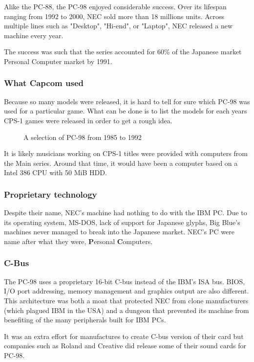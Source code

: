 Alike the PC-88, the PC-98 enjoyed considerable success. Over its lifespan ranging from 1992 to 2000, NEC sold more than 18 millions units. Across multiple lines such as "Desktop", "Hi-end", or "Laptop", NEC released a new machine every year\cite{9800lines}. 

The success was such that the series accounted for 60\% of the Japanese market Personal Computer market by 1991. 



\subsubsection{What Capcom used}
Because so many models were released, it is hard to tell for sure which PC-98 was used for a particular game. What can be done is to list the models for each years CPS-1 games were released in order to get a rough idea.

\begin{figure}[H]
\caption*{A selection of PC-98 from 1985 to 1992}
\end{figure}

It is likely musicians working on CPS-1 titles were provided with computers from the Main series. Around that time, it would have been a computer based on a Intel 386 CPU with 50 MiB HDD.


\subsubsection{Proprietary technology}

Despite their name, NEC's machine had nothing to do with the IBM PC. Due to its operating system, MS-DOS, lack of support for Japanese glyphs, Big Blue’s machines never managed to break into the
Japanese market. NEC's PC were name after what they were, \textbf{P}ersonal \textbf{C}omputers.


\subsubsection{C-Bus}
The PC-98 uses a proprietary 16-bit C-bus instead of the IBM's ISA bus. BIOS, I/O port addressing, memory management and graphics output are also different. This architecture was both a moat that protected NEC from clone manufacturers (which plagued IBM in the USA) and a dungeon that prevented its machine from benefiting of the many peripherals built for IBM PCs.


It was an extra effort for manufactures to create C-bus version of their card but companies such as Roland and Creative did release some of their sound cards for PC-98.


